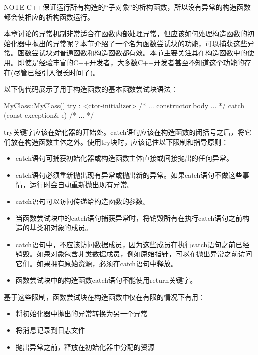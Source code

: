 \begin{myNotic}{NOTE}
C++保证运行所有构造的“子对象”的析构函数，所以没有异常的构造函数都会使相应的析构函数运行。
\end{myNotic}


本章讨论的异常机制非常适合在函数内部处理异常，但应该如何处理构造函数的初始化器中抛出的异常呢？本节介绍了一个名为函数尝试块的功能，可以捕获这些异常。函数尝试块对普通函数和构造函数都有效。本节主要关注其在构造函数中的使用。即使是经验丰富的C++开发者，大多数C++开发者甚至不知道这个功能的存在(尽管已经引入很长时间了)。

以下伪代码展示了用于构造函数的基本函数尝试块语法：

\begin{cpp}
MyClass::MyClass()
try
: <ctor-initializer>
{
    /* ... constructor body ... */
}
catch (const exception& e)
{
    /* ... */
}
\end{cpp}

try关键字应该在始化器的开始处。catch语句应该在构造函数的闭括号之后，将它们放在构造函数主体之外。使用try块时，应该记住以下限制和指导原则：

\begin{itemize}
\item
catch语句可捕获初始化器或构造函数主体直接或间接抛出的任何异常。

\item
catch语句必须重新抛出现有异常或抛出新的异常。如果catch语句不做这些事情，运行时会自动重新抛出现有异常。

\item
catch语句可以访问传递给构造函数的参数。

\item
当函数尝试块中的catch语句捕获异常时，将销毁所有在执行catch语句之前构造的基类和对象的成员。

\item
catch语句中，不应该访问数据成员，因为这些成员在执行catch语句之前已经销毁。如果对象包含非类数据成员，例如原始指针，可以在抛出异常之前访问它们。如果拥有原始资源，必须在catch语句中释放。

\item
函数尝试块中的构造函数catch语句不能使用return关键字。
\end{itemize}

基于这些限制，函数尝试块在构造函数中仅在有限的情况下有用：

\begin{itemize}
\item
将初始化器中抛出的异常转换为另一个异常

\item
将消息记录到日志文件

\item
抛出异常之前，释放在初始化器中分配的资源
\end{itemize}

